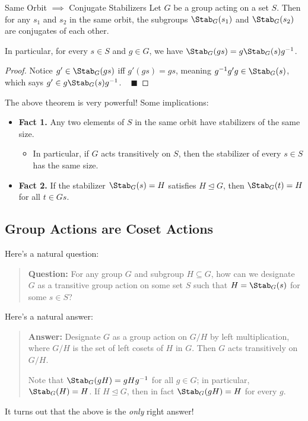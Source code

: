 \begin{theorem}{Same Orbit $\implies$ Conjugate Stabilizers}
    Let $G$ be a group acting on a set $S$.  Then for any $s_1$ and $s_2$ in the same orbit, the subgroups $\Stab_G(s_1)$ and $\Stab_G(s_2)$ are conjugates of each other.
    
    In particular, for every $s \in S$ and $g \in G$, we have $\Stab_G(gs) = g \Stab_G(s) g^{-1}$.
\end{theorem}

\begin{proof}
Notice $g' \in \Stab_G(gs)$ iff $g'(gs) = gs$, meaning $g^{-1}g'g \in \Stab_G(s)$, which says $g' \in g\Stab_G(s)g^{-1}$. ~ $\blacksquare$
\end{proof}

The above theorem is very powerful!  Some implications:
\begin{itemize}
    \item \textbf{Fact 1.} Any two elements of $S$ in the same orbit have stabilizers of the same size.
    \begin{itemize}
    \item In particular, if $G$ acts transitively on $S$, then the stabilizer of every $s \in S$ has the same size.
    \end{itemize}
    \item \textbf{Fact 2.} If the stabilizer $\Stab_G(s) = H$ satisfies $H \unlhd G$, then $\Stab_G(t) = H$ for all $t \in Gs$.
\end{itemize}

\subsection{Group Actions are Coset Actions}

Here's a natural question:
\begin{quote}
    \textbf{Question:} For any group $G$ and subgroup $H \subseteq G$, how can we designate $G$ as a transitive group action on some set $S$ such that $H = \Stab_G(s)$ for some $s \in S$?
\end{quote}
Here's a natural answer:
\begin{quote}
    \textbf{Answer:} Designate $G$ as a group action on $G / H$ by left multiplication, where $G / H$ is the set of left cosets of $H$ in $G$.  Then $G$ acts transitively on $G / H$.
    
    Note that $\Stab_G(gH) = gHg^{-1}$ for all $g \in G$; in particular, $\Stab_G(H) = H$.  If $H \unlhd G$, then in fact $\Stab_G(gH) = H$ for every $g$.
\end{quote}
It turns out that the above is the \emph{only} right answer!

